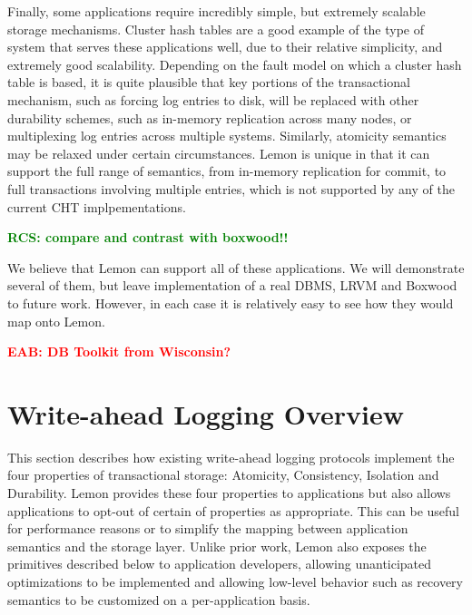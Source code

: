 \documentclass[letterpaper,twocolumn,english]{article}
\newcommand{\yad}{Lemon\xspace}
\newcommand{\eab}[1]{\textcolor{red}{\bf EAB: #1}}
\newcommand{\rcs}[1]{\textcolor{green}{\bf RCS: #1}}
\begin{document}

Finally, some applications require incredibly simple, but extremely
scalable storage mechanisms.  Cluster hash tables are a good example
of the type of system that serves these applications well, due to
their relative simplicity, and extremely good scalability.  Depending
on the fault model on which a cluster hash table is based, it is
quite plausible that key portions of the transactional mechanism, such
as forcing log entries to disk, will be replaced with other durability
schemes, such as in-memory replication across many nodes, or
multiplexing log entries across multiple systems.  Similarly,
atomicity semantics may be relaxed under certain circumstances.  \yad is unique in that it can support the full range of semantics, from in-memory replication for commit, to full transactions involving multiple entries, which is not supported by any of the current CHT implpementations.

\rcs{compare and contrast with boxwood!!}


We believe that \yad can support all of these
applications. We will demonstrate several of them, but leave
implementation of a real DBMS, LRVM and Boxwood to future work.
However, in each case it is relatively easy to see how they would map
onto \yad.


\eab{DB Toolkit from Wisconsin?}



\section{Write-ahead Logging Overview}

This section describes how existing write-ahead logging protocols
implement the four properties of transactional storage: Atomicity,
Consistency, Isolation and Durability.  \yad provides these four
properties to applications but also allows applications to opt-out of
certain of properties as appropriate.  This can be useful for
performance reasons or to simplify the mapping between application
semantics and the storage layer.  Unlike prior work, \yad also exposes
the primitives described below to application developers, allowing
unanticipated optimizations to be implemented and allowing low-level
behavior such as recovery semantics to be customized on a
per-application basis.
\end{document}
